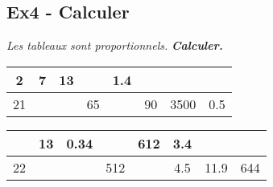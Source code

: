 \documentclass[12pt]{article}
\begin{document}
\subsection*{Ex4 - Calculer}

\textit{Les tableaux sont proportionnels.} \textit{\textbf{Calculer.}}

\begin{center}
  \begin{tabular}{|c|c|c|c|c|c|c|c|}
    \hline
    2  &               7 &              13 & \phantom{$\dfrac{\dfrac{123456789}{1}}{1}$} &             1.4 & \phantom{$\dfrac{\dfrac{123456789}{1}}{1}$} & \phantom{$\dfrac{\dfrac{123456789}{1}}{1}$} & \phantom{$\dfrac{\dfrac{123456789}{1}}{1}$}  \\  \hline
    21 & \phantom{$\dfrac{\dfrac{123456789}{1}}{1}$} & \phantom{$\dfrac{\dfrac{123456789}{1}}{1}$} &              65 & \phantom{$\dfrac{\dfrac{123456789}{1}}{1}$} &             90 &            3500 &              0.5 \\  \hline
  \end{tabular}
\end{center} 

\begin{center}
  \begin{tabular}{|c|c|c|c|c|c|c|c|}
    \hline
    \phantom{$\dfrac{\dfrac{123456789}{1}}{1}$} &               13 &            0.34 & \phantom{$\dfrac{\dfrac{123456789}{1}}{1}$} &             612 & 3.4 & \phantom{$\dfrac{\dfrac{123456789}{1}}{1}$} & \phantom{$\dfrac{\dfrac{123456789}{1}}{1}$} \\  \hline
    22              &  \phantom{$\dfrac{\dfrac{123456789}{1}}{1}$} & \phantom{$\dfrac{\dfrac{123456789}{1}}{1}$} &             512 & \phantom{$\dfrac{\dfrac{123456789}{1}}{1}$} & 4.5 &            11.9 &             644 \\  \hline
  \end{tabular}
\end{center} 
\end{document}
